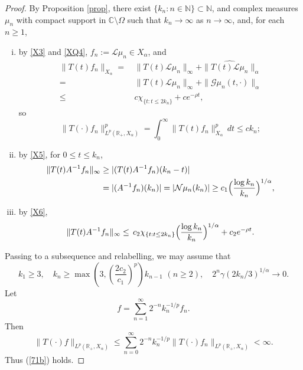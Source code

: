 \documentclass[11pt]{amsart}
\theoremstyle{definition}
\theoremstyle{remark}
\numberwithin{equation}{section}
\begin{document}
\begin{proof}
By Proposition \ref{prop}, there exist $\{k_n : n \in {{\mathbb N}}\}\subset \mathbb N$, and complex measures $\mu_n$ with compact support in ${{\mathbb C}} \setminus \Omega$ such that $k_n \to \infty$ as $n \to \infty$, and, for each $n\ge1$,
\begin{enumerate}[(i)]
\item  by \eqref{X3} and \eqref{XQ4}, $f_n := {{\mathcal L}}\mu_n \in X_\alpha$, and
\begin{align*}
\|T(t)f_n\|_{X_\alpha}=\,& \|T(t){{\mathcal L}}\mu_n\|_{\infty}+\|\widehat{T(t){{\mathcal L}} \mu_n}\|_{\alpha}
\\
=\,& \|T(t){{\mathcal L}}\mu_n\|_{\infty}+\|\mathcal G\mu_n(t,\cdot)\|_{\alpha}
\\
\le\,&
c\chi_{\{t:t\le 2k_n\}}+ ce^{-\rho t},
\end{align*}
so
\[
\|T(\cdot)f_n\|_{L^p({{\mathbb R}}_+,X_\alpha)}^p = \int_0^\infty \|T(t)f_n\|_{X_\alpha}^p \, dt \le ck_n;
\]
\item by \eqref{X5}, for $0\le t \le k_n$,
\begin{align*}
\|T(t)A^{-1}f_n\|_{\infty} &\ge |(T(t)A^{-1}f_n)(k_n-t)| \\
&= |(A^{-1}f_n)(k_n)|=|{{\mathcal N}}\mu_n (k_n)| \ge c_1\Bigl(\frac{\log k_n}{k_n}\Bigr)^{1/\alpha},
\end{align*}
\item by \eqref{X6},
$$
\|T(t)A^{-1}f_n\|_{\infty}\le\, c_2\chi_{\{t:t\le 2k_n\}}\Bigl(\frac{\log k_n}{k_n}\Bigr)^{1/\alpha}+
c_2e^{-\rho t}.
$$
\end{enumerate}
Passing to a subsequence and relabelling, we may assume that
$$
k_1 \ge 3, \quad  k_n \ge \max \left(3, \left(\frac{2c_2}{c_1}\right)^p \right) k_{n-1} \,\, (n\ge2), \quad 2^n \gamma(2k_n/3)^{1/\alpha} \to 0.
$$
Let
$$
f=\sum_{n=1}^\infty 2^{-n}k_{n}^{-1/p}f_{n}.
$$
Then
\[
\|T(\cdot)f\|_{L^p({{\mathbb R}}_+,X_\alpha)} \le \sum_{n=0}^\infty 2^{-n} k_{n}^{-1/p} \|T(\cdot)f_{n}\|_{L^p({{\mathbb R}}_+,X_\alpha)} < \infty.
\]
Thus (\ref{71b}) holds.


\end{proof}
\end{document}

